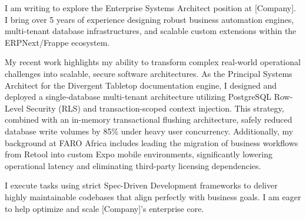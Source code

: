 \documentclass[12pt, a4paper]{awesome-cv}
\begin{document}
\makecvheader[R]


\makelettertitle

\begin{cvletter}


  I am writing to explore the Enterprise Systems Architect position at [Company]. I bring over 5 years of experience designing robust business automation engines, multi-tenant database infrastructures, and scalable custom extensions within the ERPNext/Frappe ecosystem.


  My recent work highlights my ability to transform complex real-world operational challenges into scalable, secure software architectures. As the Principal Systems Architect for the Divergent Tabletop documentation engine, I designed and deployed a single-database multi-tenant architecture utilizing PostgreSQL Row-Level Security (RLS) and transaction-scoped context injection. This strategy, combined with an in-memory transactional flushing architecture, safely reduced database write volumes by 85\% under heavy user concurrency. Additionally, my background at FARO Africa includes leading the migration of business workflows from Retool into custom Expo mobile environments, significantly lowering operational latency and eliminating third-party licensing dependencies.


  I execute tasks using strict Spec-Driven Development frameworks to deliver highly maintainable codebases that align perfectly with business goals. I am eager to help optimize and scale [Company]'s enterprise core.

\end{cvletter}

\makeletterclosing
\end{document}
